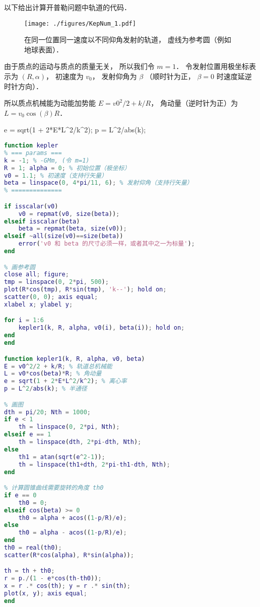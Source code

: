 
\begin{issues}
\issueDraft
{}
\end{issues}


以下给出计算开普勒问题中轨道的代码．
\begin{figure}[ht]
\centering
\texttt{[image: ./figures/KepNum\_1.pdf]}
\caption{在同一位置同一速度以不同仰角发射的轨道， 虚线为参考圆（例如地球表面）．} \label{KepNum_fig1}
\end{figure}

由于质点的运动与质点的质量无关， 所以我们令 $m=1$． 令发射位置用极坐标表示为 $(R,\alpha)$， 初速度为 $v_0$， 发射仰角为 $\beta$ （顺时针为正， $\beta=0$ 时速度延逆时针方向）． 

所以质点机械能为动能加势能 $E = v0^2/2 + k/R$， 角动量（逆时针为正）为 $L = v_0\cos(\beta) R$．

e = sqrt(1 + 2*E*L^2/k^2); %
p = L^2/abs(k); %

\begin{lstlisting}[language=matlab]
% 已知初始位置、发射速度、发射方向， 求轨道以及运动方程
function kepler
% === params ===
k = -1; % -GMm, (令 m=1)
R = 1; alpha = 0; % 初始位置（极坐标）
v0 = 1.1; % 初速度（支持行矢量）
beta = linspace(0, 4*pi/11, 6); % 发射仰角（支持行矢量）
% ==============

if isscalar(v0)
    v0 = repmat(v0, size(beta));
elseif isscalar(beta)
    beta = repmat(beta, size(v0));
elseif ~all(size(v0)==size(beta))
    error('v0 和 beta 的尺寸必须一样，或者其中之一为标量');
end

% 画参考圆
close all; figure;
tmp = linspace(0, 2*pi, 500);
plot(R*cos(tmp), R*sin(tmp), 'k--'); hold on;
scatter(0, 0); axis equal;
xlabel x; ylabel y;

for i = 1:6
    kepler1(k, R, alpha, v0(i), beta(i)); hold on;
end
end

function kepler1(k, R, alpha, v0, beta)
E = v0^2/2 + k/R; % 轨道总机械能
L = v0*cos(beta)*R; % 角动量
e = sqrt(1 + 2*E*L^2/k^2); % 离心率
p = L^2/abs(k); % 半通径

% 画图
dth = pi/20; Nth = 1000;
if e < 1
    th = linspace(0, 2*pi, Nth);
elseif e == 1
    th = linspace(dth, 2*pi-dth, Nth);
else
    th1 = atan(sqrt(e^2-1));
    th = linspace(th1+dth, 2*pi-th1-dth, Nth);
end

% 计算圆锥曲线需要旋转的角度 th0
if e == 0
    th0 = 0;
elseif cos(beta) >= 0
    th0 = alpha + acos((1-p/R)/e);
else
    th0 = alpha - acos((1-p/R)/e);
end
th0 = real(th0);
scatter(R*cos(alpha), R*sin(alpha));

th = th + th0;
r = p./(1 - e*cos(th-th0));
x = r .* cos(th); y = r .* sin(th);
plot(x, y); axis equal;
end
\end{lstlisting}
